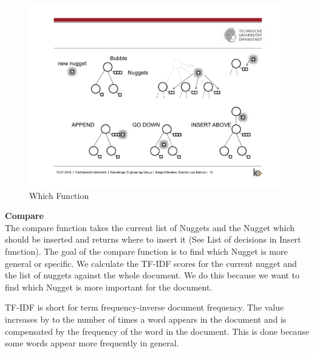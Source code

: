 \begin{figure}[H]
	\centering
	\includegraphics[trim=14cm 10cm 7cm 5.5cm, clip=true]{img/step2_func.pdf}
	\caption{Which Function}
	\label{fig:jsd}
\end{figure}


\textbf{Compare}\\

The compare function takes the current list of Nuggets and the Nugget which should be inserted and returns where to insert it (See List of decisions in Insert function). The goal of the compare function is to find which Nugget is more general or specific. We calculate the TF-IDF scores for the current nugget and the list of nuggets against the whole document. We do this because we want to find which Nugget is more important for the document.

TF-IDF is short for term frequency-inverse document frequency. The value increases by to the number of times a word appears in the document and is compensated by the frequency of the word in the document. This is done because some words appear more frequently in general. 




